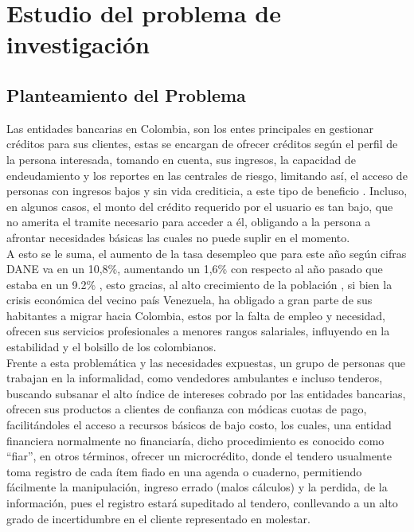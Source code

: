 \section{Estudio del problema de investigación}

	\subsection{Planteamiento del Problema}
	
	{Las entidades bancarias en Colombia, son los entes principales en gestionar créditos para sus clientes, estas se encargan de ofrecer créditos según el perfil de la persona interesada, tomando en cuenta, sus ingresos, la capacidad de endeudamiento y los reportes en las centrales de riesgo, limitando así, el acceso de personas con ingresos bajos y sin vida crediticia, a este tipo de beneficio \cite{bankrep}. Incluso, en algunos casos, el monto del crédito requerido por el usuario es tan bajo, que no amerita el tramite necesario para acceder a él, obligando a la persona a afrontar necesidades básicas las cuales no puede suplir en el momento.\\
		
	A esto se le suma, el aumento de la tasa desempleo que para este año según cifras DANE va en un 10,8\%, aumentando un 1,6\% con respecto al año pasado que estaba en un 9.2\% \cite{dane}, esto gracias, al alto crecimiento de la población \cite{unemployment}, si bien la crisis económica del vecino país Venezuela, ha obligado a gran parte de sus habitantes a migrar hacia Colombia, estos por la falta de empleo y necesidad,  ofrecen sus servicios profesionales a menores rangos salariales,  influyendo en la estabilidad y el bolsillo de los colombianos.\\
	
	Frente a esta problemática y las necesidades expuestas, un grupo de personas que trabajan en la informalidad, como vendedores ambulantes e incluso tenderos, buscando subsanar el alto índice de intereses cobrado por las entidades bancarias, ofrecen sus productos a clientes de confianza con módicas cuotas de pago, facilitándoles el acceso a recursos básicos de bajo costo, los cuales, una entidad financiera normalmente no financiaría, dicho procedimiento es conocido como “fiar”, en otros términos, ofrecer un microcrédito, donde el tendero usualmente toma registro de cada ítem fiado en una agenda o cuaderno, permitiendo fácilmente la manipulación, ingreso errado (malos cálculos) y la perdida, de la información, pues el registro estará supeditado al tendero, conllevando a un alto grado de incertidumbre en el cliente representado en molestar.\\

}
